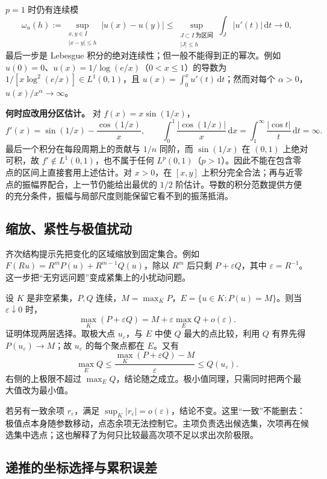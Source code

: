 \documentclass[UTF8,12pt,a4paper,fontset=fandol]{ctexart}
\begin{document}
$p=1$ 时仍有连续模
\[
\omega_u(h):=\sup_{\substack{x,y\in I\\|x-y|\le h}}|u(x)-u(y)|
\le\sup_{\substack{J\subset I\ \text{为区间}\\|J|\le h}}
\int_J|u'(t)|\,\mathrm dt\longrightarrow0,
\]
最后一步是 Lebesgue 积分的绝对连续性；但一般不能得到正的幂次。例如 $u(0)=0$、$u(x)=1/\log(e/x)$（$0<x\le1$）的导数为 $1/[x\log^2(e/x)]\in L^1(0,1)$，且 $u(x)=\int_0^xu'(t)\,\mathrm dt$；然而对每个 $\alpha>0$，$u(x)/x^\alpha\to\infty$。

\textbf{何时应改用分区估计。} 对 $f(x)=x\sin(1/x)$，
\[
f'(x)=\sin(1/x)-\frac{\cos(1/x)}x,
\qquad
\int_0^1\frac{|\cos(1/x)|}{x}\,\mathrm dx
=\int_1^\infty\frac{|\cos t|}{t}\,\mathrm dt=\infty.
\]
最后一个积分在每段周期上的贡献与 $1/n$ 同阶，而 $\sin(1/x)$ 在 $(0,1)$ 上绝对可积，故 $f'\notin L^1(0,1)$，也不属于任何 $L^p(0,1)$（$p>1$）。因此不能在包含零点的区间上直接套用上述估计。对 $x>0$，在 $[x,y]$ 上积分完全合法；再与近零点的振幅界配合，上一节仍能给出最优的 $1/2$ 阶估计。导数的积分范数提供方便的充分条件，振幅与局部尺度则能保留它看不到的振荡抵消。

\subsection{缩放、紧性与极值扰动}

\label{app:estimate-scaling}

齐次结构提示先把变化的区域缩放到固定集合。例如 $F(Ru)=R^mP(u)+R^{m-1}Q(u)$，除以 $R^m$ 后只剩 $P+\varepsilon Q$，其中 $\varepsilon=R^{-1}$。这一步把“无穷远问题”变成紧集上的小扰动问题。

设 $K$ 是非空紧集，$P,Q$ 连续，$M=\max_KP$，$E=\{u\in K:P(u)=M\}$。则当 $\varepsilon\downarrow0$ 时，
\[
\max_K(P+\varepsilon Q)=M+\varepsilon\max_EQ+o(\varepsilon).
\]
证明体现两层选择。取极大点 $u_\varepsilon$，与 $E$ 中使 $Q$ 最大的点比较，利用 $Q$ 有界先得 $P(u_\varepsilon)\to M$；故 $u_\varepsilon$ 的每个聚点都在 $E$。又有
\[
\max_EQ\leq\frac{\max_K(P+\varepsilon Q)-M}{\varepsilon}
\leq Q(u_\varepsilon).
\]
右侧的上极限不超过 $\max_EQ$，结论随之成立。极小值同理，只需同时把两个最大值改为最小值。

若另有一致余项 $r_\varepsilon$，满足 $\sup_K|r_\varepsilon|=o(\varepsilon)$，结论不变。这里“一致”不能删去：极值点本身随参数移动，点态余项无法控制它。主项负责选出候选集，次项再在候选集中选点；这也解释了为何只比较最高次项不足以求出次阶极限。

\subsection{递推的坐标选择与累积误差}
\end{document}
